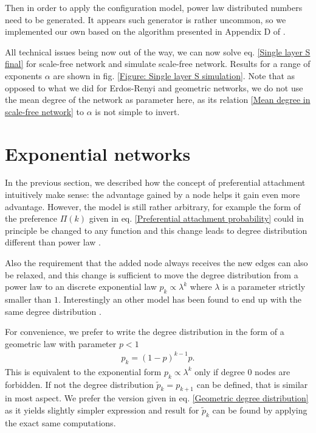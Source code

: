 \documentclass[
11pt, %
english, %
singlespacing, %
nolistspacing, %
liststotoc, %
headsepline, %
]{MastersDoctoralThesis} %
\begin{document}
Then in order to apply the configuration model, power law distributed numbers need to be generated. It appears such generator is rather uncommon, so we implemented our own based on the algorithm presented in Appendix D of \cite{clauset2009power}.

All technical issues being now out of the way, we can now solve eq. \eqref{Single layer S final} for scale-free network and simulate scale-free network. Results for a range of exponents $\alpha$ are shown in fig. \ref{Figure: Single layer S simulation}. Note that as opposed to what we did for Erdos-Renyi and geometric networks, we do not use the mean degree of the network as parameter here, as its relation \eqref{Mean degree in scale-free network} to $\alpha$ is not simple to invert.

\section{Exponential networks}
\label{Section: Exponential networks}

In the previous section, we described how the concept of preferential attachment intuitively make sense: the advantage gained by a node helps it gain even more advantage. However, the model is still rather arbitrary, for example the form of the preference $\Pi(k)$ given in eq. \eqref{Preferential attachment probability} could in principle be changed to any function and this change leads to degree distribution different than power law \cite{krapivsky2000connectivity}.

Also the requirement that the added node always receives the new edges can also be relaxed, and this change is sufficient to move the degree distribution from a power law to an discrete exponential law
\cite{callaway2001randomly} $p_k \propto \lambda^{k}$ where $\lambda$ is a parameter strictly smaller than $1$. Interestingly an other model has been found to end up with the same degree distribution \cite{jing2005exponential}.

For convenience, we prefer to write the degree distribution in the form of a geometric law with parameter $p < 1$
\begin{align}
	p_k = (1 - p)^{k-1} p. \label{Geometric degree distribution}
\end{align}
This is equivalent to the exponential form $p_k \propto \lambda^{k}$ only if degree $0$ nodes are forbidden. If not the degree distribution $\tilde{p}_k = p_{k + 1}$ can be defined, that is similar in most aspect. We prefer the version given in eq. \eqref{Geometric degree distribution} as it yields slightly simpler expression and result for $\tilde{p}_k$ can be found by applying the exact same computations.
\end{document}

